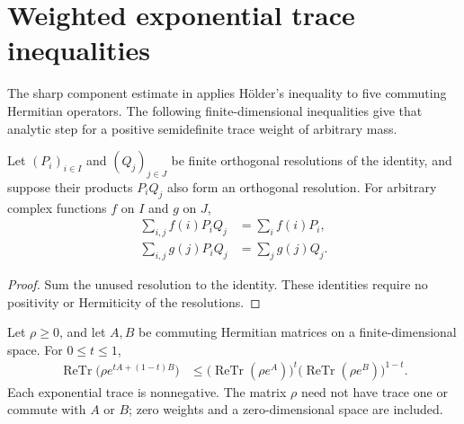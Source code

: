 \section{Weighted exponential trace inequalities}
\label{sec:weighted-trace-holder}

The sharp component estimate in
\cite[Section~7, lines~553--560]{OpenAI2026AreaLaw} applies H\"older's
inequality to five commuting Hermitian operators. The following finite-dimensional
inequalities give that analytic step for a positive semidefinite trace weight
of arbitrary mass.

\begin{theorem}
\label{thm:resolution-product-coordinates}
\leanok
Let $(P_i)_{i\in I}$ and $(Q_j)_{j\in J}$ be finite orthogonal resolutions
of the identity, and suppose their products $P_iQ_j$ also form an orthogonal
resolution. For arbitrary complex functions $f$ on $I$ and $g$ on $J$,
\begin{align}
 \sum_{i,j}f(i)P_iQ_j&=\sum_i f(i)P_i,\\
 \sum_{i,j}g(j)P_iQ_j&=\sum_j g(j)Q_j.
\end{align}
\end{theorem}

\begin{proof}
\leanok
Sum the unused resolution to the identity. These identities require no
positivity or Hermiticity of the resolutions.
\end{proof}

\begin{theorem}
\label{thm:weighted-trace-holder-binary}
\leanok
Let $\rho\ge0$, and let $A,B$ be commuting Hermitian matrices on a finite-dimensional
space. For $0\le t\le1$,
\begin{align}
 \operatorname{ReTr}\bigl(\rho e^{tA+(1-t)B}\bigr)
 &\le \bigl(\operatorname{ReTr}(\rho e^A)\bigr)^t
        \bigl(\operatorname{ReTr}(\rho e^B)\bigr)^{1-t}.
 \label{eq:weighted_holder_binary}
\end{align}
Each exponential trace is nonnegative. The matrix $\rho$ need not have trace
one or commute with $A$ or $B$; zero weights and a zero-dimensional space
are included.
\end{theorem}

